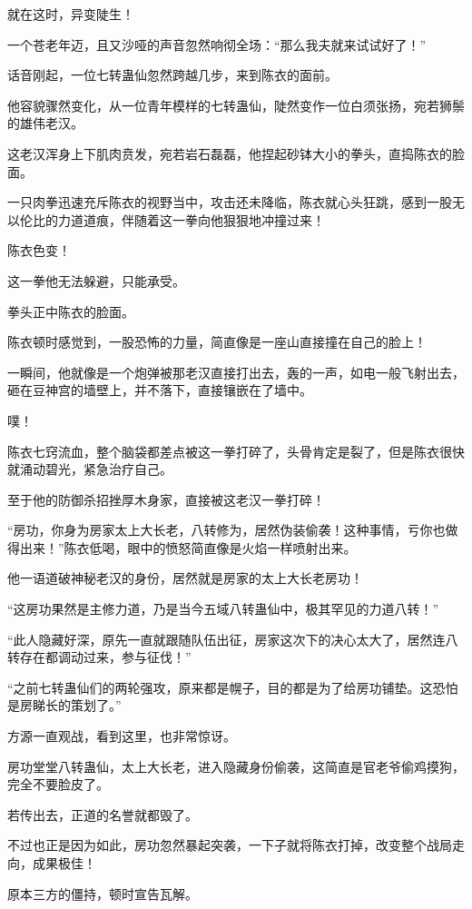 \begin{this_body}
就在这时，异变陡生！

一个苍老年迈，且又沙哑的声音忽然响彻全场：“那么我夫就来试试好了！”

话音刚起，一位七转蛊仙忽然跨越几步，来到陈衣的面前。

他容貌骤然变化，从一位青年模样的七转蛊仙，陡然变作一位白须张扬，宛若狮鬃的雄伟老汉。

这老汉浑身上下肌肉贲发，宛若岩石磊磊，他捏起砂钵大小的拳头，直捣陈衣的脸面。

一只肉拳迅速充斥陈衣的视野当中，攻击还未降临，陈衣就心头狂跳，感到一股无以伦比的力道道痕，伴随着这一拳向他狠狠地冲撞过来！

陈衣色变！

这一拳他无法躲避，只能承受。

拳头正中陈衣的脸面。

陈衣顿时感觉到，一股恐怖的力量，简直像是一座山直接撞在自己的脸上！

一瞬间，他就像是一个炮弹被那老汉直接打出去，轰的一声，如电一般飞射出去，砸在豆神宫的墙壁上，并不落下，直接镶嵌在了墙中。

噗！

陈衣七窍流血，整个脑袋都差点被这一拳打碎了，头骨肯定是裂了，但是陈衣很快就涌动碧光，紧急治疗自己。

至于他的防御杀招挫厚木身家，直接被这老汉一拳打碎！

“房功，你身为房家太上大长老，八转修为，居然伪装偷袭！这种事情，亏你也做得出来！”陈衣低喝，眼中的愤怒简直像是火焰一样喷射出来。

他一语道破神秘老汉的身份，居然就是房家的太上大长老房功！

“这房功果然是主修力道，乃是当今五域八转蛊仙中，极其罕见的力道八转！”

“此人隐藏好深，原先一直就跟随队伍出征，房家这次下的决心太大了，居然连八转存在都调动过来，参与征伐！”

“之前七转蛊仙们的两轮强攻，原来都是幌子，目的都是为了给房功铺垫。这恐怕是房睇长的策划了。”

方源一直观战，看到这里，也非常惊讶。

房功堂堂八转蛊仙，太上大长老，进入隐藏身份偷袭，这简直是官老爷偷鸡摸狗，完全不要脸皮了。

若传出去，正道的名誉就都毁了。

不过也正是因为如此，房功忽然暴起突袭，一下子就将陈衣打掉，改变整个战局走向，成果极佳！

原本三方的僵持，顿时宣告瓦解。


\end{this_body}
